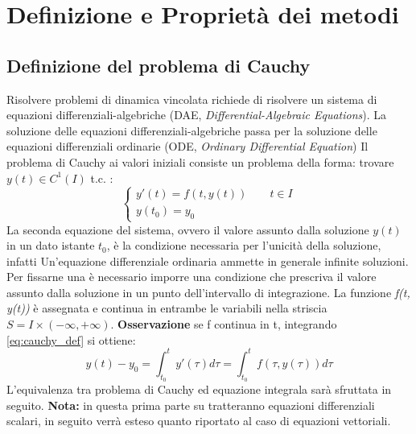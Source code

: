 \chapter{Definizione e Proprietà dei metodi} \label{chap:cauchy}
\section{Definizione del problema di Cauchy}
Risolvere problemi di dinamica vincolata richiede di risolvere un sistema di equazioni differenziali-algebriche (DAE, \emph{Differential-Algebraic Equations}). La soluzione delle equazioni differenziali-algebriche passa per la soluzione delle equazioni differenziali ordinarie (ODE, \emph{Ordinary Differential Equation})
Il problema di Cauchy ai valori iniziali consiste un problema della forma:\newline
trovare $y(t)\in C^1(I)$ t.c. :
\begin{equation}  \label{eq:cauchy_def}  \begin{cases}
y'(t) = f(t, y(t)) \qquad  t\in I \\
y(t_0) = y_0 
\end{cases}
\end{equation}
La seconda equazione del sistema, ovvero il valore assunto dalla soluzione $y(t)$ in un dato istante $t_0$, è la condizione necessaria per l'unicità della soluzione, infatti Un’equazione differenziale ordinaria ammette in generale infinite soluzioni. Per fissarne una è necessario imporre una condizione che prescriva il valore assunto dalla soluzione in un punto dell'intervallo di integrazione.
La funzione \emph{f(t, y(t))} è assegnata e continua in entrambe le variabili nella striscia $ S = I \times (- \infty , + \infty)$. \newline
\textbf{Osservazione} se f continua in t, integrando \ref{eq:cauchy_def} si ottiene:
\begin{equation} \label{eq:cauchy_integral_equivalence}
y(t) - y_0 = \int^t_{t_0} y'(\tau)d\tau = \int^t_{t_0}f(\tau,y(\tau)) d\tau \end{equation}
L'equivalenza tra problema di Cauchy ed equazione integrala sarà sfruttata in seguito. \newline
\textbf{Nota:} in questa prima parte su tratteranno equazioni differenziali scalari, in seguito verrà esteso quanto riportato al caso di equazioni vettoriali.
